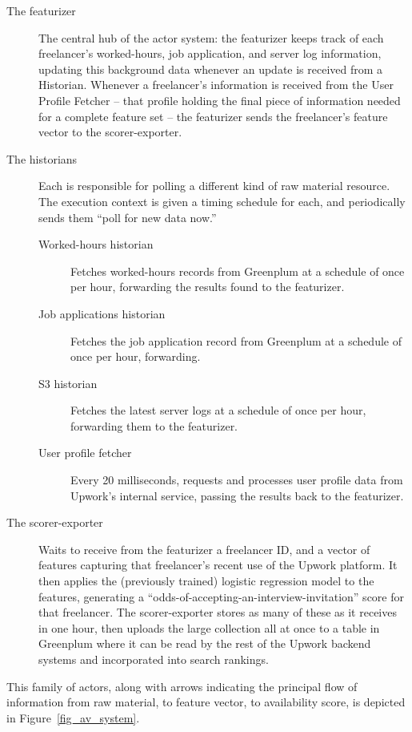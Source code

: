\documentclass{article}
\begin{document}
\begin{description}
\item[The featurizer] The central hub of the actor system: the featurizer keeps track of
each freelancer's worked-hours, job application, and server log information,
updating this background data whenever an update is received from a Historian.
Whenever a freelancer's information is received from the User Profile Fetcher -- that 
profile holding the final piece of information needed for a complete feature set --
the featurizer sends the freelancer's feature vector to the scorer-exporter.

\item[The historians] Each is responsible for polling a different kind of raw
material resource. The execution context is given a timing schedule for
each, and periodically sends them ``poll for new data now.''
	\begin{description}
	\item[Worked-hours historian] Fetches worked-hours records from 
	Greenplum at a schedule of once per hour, forwarding the results found
	to the featurizer.
	\item[Job applications historian] Fetches the job application record from
	Greenplum at a schedule of once per hour, forwarding.
	\item[S3 historian] Fetches the latest server logs at a schedule of once per hour,
	forwarding them to the featurizer.
	\item[User profile fetcher] Every 20 milliseconds, requests and processes user 
	profile data from Upwork's internal service, passing the results back to the featurizer.
	\end{description}

\item[The scorer-exporter] Waits to receive from the featurizer  a freelancer ID, and a
vector of features capturing that freelancer's recent use of the Upwork platform.
It then applies the (previously trained) logistic regression model to the features,
generating a ``odds-of-accepting-an-interview-invitation'' score for that freelancer.
The scorer-exporter stores as many of these as it receives in one hour, then
uploads the large collection all at once to a table in Greenplum where it can be
read by the rest of the Upwork backend systems and incorporated into search
rankings.

\end{description}

This family of actors, along with arrows indicating the principal flow of information 
from raw material, to feature vector, to availability score, is depicted in
Figure~\ref{fig_av_system}.
\end{document}
